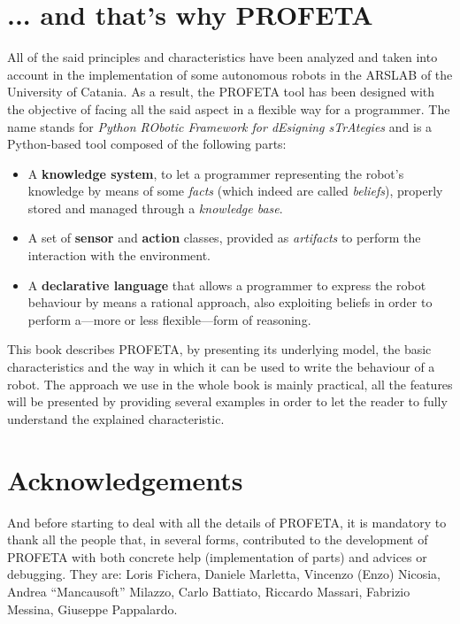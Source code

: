 \section{... and that's why PROFETA}
All of the said principles and characteristics have been analyzed and
taken into account in the implementation of some autonomous robots in the
ARSLAB of the University of Catania.
As a result, the PROFETA tool has been designed with the objective of
facing all the said aspect in a flexible way for a programmer.
The name stands for \emph{Python RObotic Framework for
  dEsigning sTrAtegies} and is a Python-based tool composed of the
following parts:
\begin{itemize}
\item A \textbf{knowledge system}, to let a programmer representing the
  robot's knowledge by means of some \emph{facts} (which indeed are called
  \emph{beliefs}), properly stored and managed through a \emph{knowledge
    base}.
\item A set of \textbf{sensor} and \textbf{action} classes, provided as
  \emph{artifacts} to perform the interaction with the environment.
\item A \textbf{declarative language} that allows a programmer to express the
  robot behaviour by means a rational approach, also exploiting beliefs in
  order to perform a---more or less flexible---form of reasoning.
\end{itemize}
This book describes PROFETA, by presenting its underlying model, the basic
characteristics and the way in which it can be used to write
the behaviour of a robot.
The approach we use in the whole book is mainly practical, all the features
will be presented by providing several examples in order to let the reader
to fully understand the explained characteristic.


\section{Acknowledgements}
And before starting to deal with all the details of PROFETA, it is
mandatory to thank all the people that, in several forms, contributed to
the development of PROFETA with both concrete help (implementation of
parts) and advices or debugging.
They are: Loris Fichera, Daniele Marletta, Vincenzo (Enzo) Nicosia,
Andrea ``Mancausoft'' Milazzo, Carlo Battiato, Riccardo Massari, Fabrizio
Messina, Giuseppe Pappalardo.

